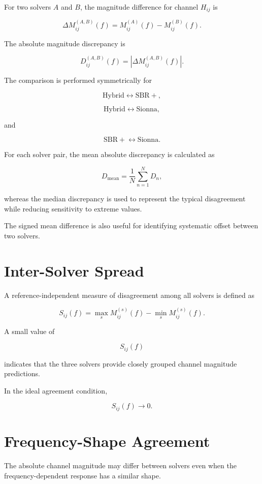 \documentclass[11pt,a4paper]{article}
\begin{document}
For two solvers $A$ and $B$, the magnitude difference for channel $H_{ij}$ is

\[
\Delta M_{ij}^{(A,B)}(f)
=
M_{ij}^{(A)}(f)
-
M_{ij}^{(B)}(f).
\]

The absolute magnitude discrepancy is

\[
D_{ij}^{(A,B)}(f)
=
\left|
\Delta M_{ij}^{(A,B)}(f)
\right|.
\]

The comparison is performed symmetrically for

\[
\mathrm{Hybrid}
\leftrightarrow
\mathrm{SBR+},
\]

\[
\mathrm{Hybrid}
\leftrightarrow
\mathrm{Sionna},
\]

and

\[
\mathrm{SBR+}
\leftrightarrow
\mathrm{Sionna}.
\]

For each solver pair, the mean absolute discrepancy is calculated as

\[
D_{\mathrm{mean}}
=
\frac{1}{N}
\sum_{n=1}^{N}
D_n,
\]

whereas the median discrepancy is used to represent the typical disagreement while reducing sensitivity to extreme values.

The signed mean difference is also useful for identifying systematic offset between two solvers.

\section{Inter-Solver Spread}

A reference-independent measure of disagreement among all solvers is defined as

\[
S_{ij}(f)
=
\max_s
M_{ij}^{(s)}(f)
-
\min_s
M_{ij}^{(s)}(f).
\]

A small value of

\[
S_{ij}(f)
\]

indicates that the three solvers provide closely grouped channel magnitude predictions.

In the ideal agreement condition,

\[
S_{ij}(f)
\rightarrow 0.
\]

\section{Frequency-Shape Agreement}

The absolute channel magnitude may differ between solvers even when the frequency-dependent response has a similar shape.
\end{document}
